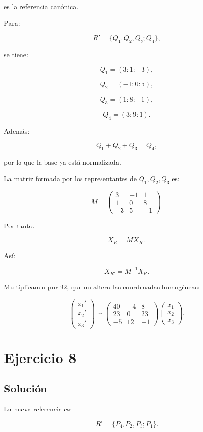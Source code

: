 \documentclass[11pt,a4paper]{article}
\begin{document}
es la referencia canónica.

Para:

\[
R'=\{Q_1,Q_2,Q_3;Q_4\},
\]

se tiene:

\[
Q_1=(3:1:-3),
\]

\[
Q_2=(-1:0:5),
\]

\[
Q_3=(1:8:-1),
\]

\[
Q_4=(3:9:1).
\]

Además:

\[
Q_1+Q_2+Q_3=Q_4,
\]

por lo que la base ya está normalizada.

La matriz formada por los representantes de \(Q_1,Q_2,Q_3\) es:

\[
M=
\begin{pmatrix}
3&-1&1\\
1&0&8\\
-3&5&-1
\end{pmatrix}.
\]

Por tanto:

\[
X_R=M X_{R'}.
\]

Así:

\[
X_{R'}=M^{-1}X_R.
\]

Multiplicando por \(92\), que no altera las coordenadas homogéneas:

\[
\boxed{
\begin{pmatrix}
x_1'\\x_2'\\x_3'
\end{pmatrix}
\sim
\begin{pmatrix}
40&-4&8\\
23&0&23\\
-5&12&-1
\end{pmatrix}
\begin{pmatrix}
x_1\\x_2\\x_3
\end{pmatrix}.
}
\]

\section{Ejercicio 8}
\subsection{Solución}

La nueva referencia es:

\[
R'=\{P_4,P_2,P_3;P_1\}.
\]
\end{document}
